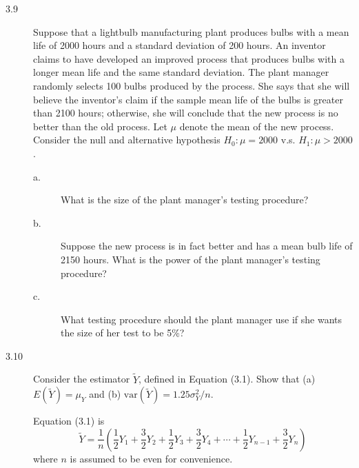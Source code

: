 \documentclass[a4paper,11pt]{article}
\newcommand{\var}{\mathrm{var}}
\begin{document}
\begin{description}
\item[{3.9}] Suppose that a lightbulb manufacturing plant produces bulbs
with a mean life of 2000 hours and a standard deviation of
200 hours. An inventor claims to have developed an improved
process that produces bulbs with a longer mean life and the
same standard deviation. The plant manager randomly selects
100 bulbs produced by the process. She says that she will
believe the inventor's claim if the sample mean life of the
bulbs is greater than 2100 hours; otherwise, she will
conclude that the new process is no better than the old
process. Let \(\mu\) denote the mean of the new process. Consider
the null and alternative hypothesis \(H_0: \mu = 2000\)
v.s. \(H_1: \mu > 2000\).
\begin{description}
\item[{a.}] What is the size of the plant manager's testing procedure?
\item[{b.}] Suppose the new process is in fact better and has a mean
bulb life of 2150 hours. What is the power of the plant
manager's testing procedure?
\item[{c.}] What testing procedure should the plant manager use if she
wants the size of her test to be 5\%?
\end{description}
\end{description}


\begin{description}
\item[{3.10}] Consider the estimator \(\tilde{Y}\), defined in Equation
(3.1). Show that (a) \(E(\tilde{Y}) = \mu_Y\) and (b)
\(\var(\tilde{Y}) = 1.25\sigma^2_Y/n\).

Equation (3.1) is
\[ \tilde{Y} = \frac{1}{n}(\frac{1}{2}Y_1 + \frac{3}{2}Y_2 +
          \frac{1}{2}Y_3 + \frac{3}{2}Y_4 + \cdots +
          \frac{1}{2}Y_{n-1} + \frac{3}{2}Y_n) \]
where \(n\) is assumed to be even for convenience.
\end{description}
\end{document}

